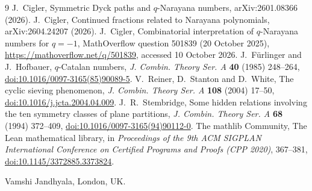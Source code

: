 \documentclass[11pt]{article}
\theoremstyle{remark}
\begin{document}
\begin{thebibliography}{9}
 J.~Cigler, Symmetric Dyck paths and $q$-Narayana numbers, arXiv:2601.08366 (2026).
 J.~Cigler, Continued fractions related to Narayana polynomials, arXiv:2604.24207 (2026).
 J.~Cigler, Combinatorial interpretation of $q$-Narayana numbers for $q=-1$,
MathOverflow question 501839 (20 October 2025), \url{https://mathoverflow.net/q/501839},
accessed 10 October 2026.
 J.~F\"urlinger and J.~Hofbauer, $q$-Catalan numbers, \emph{J. Combin. Theory Ser. A}
\textbf{40} (1985) 248--264, \href{https://doi.org/10.1016/0097-3165(85)90089-5}{doi:10.1016/0097-3165(85)90089-5}.
 V.~Reiner, D.~Stanton and D.~White, The cyclic sieving phenomenon, \emph{J. Combin.
Theory Ser. A} \textbf{108} (2004) 17--50, \href{https://doi.org/10.1016/j.jcta.2004.04.009}{doi:10.1016/j.jcta.2004.04.009}.
 J.~R.~Stembridge, Some hidden relations involving the ten symmetry classes of plane
partitions, \emph{J. Combin. Theory Ser. A} \textbf{68} (1994) 372--409,
\href{https://doi.org/10.1016/0097-3165(94)90112-0}{doi:10.1016/0097-3165(94)90112-0}.
 The mathlib Community, The Lean mathematical library, in \emph{Proceedings of the
9th ACM SIGPLAN International Conference on Certified Programs and Proofs (CPP 2020)}, 367--381,
\href{https://doi.org/10.1145/3372885.3373824}{doi:10.1145/3372885.3373824}.
\end{thebibliography}

\bigskip
\noindent Vamshi Jandhyala, London, UK.
\end{document}
